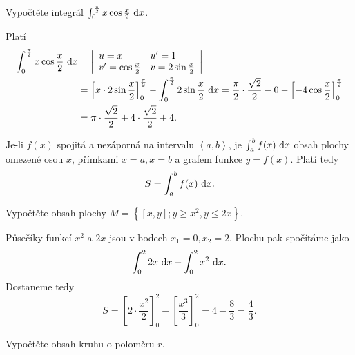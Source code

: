 \begin{priklad}
Vypočtěte integrál $\int _0^{\frac{\pi}{2}}x \cos \frac{x}{2}\, \mathop{}\!\mathrm{d} x$.
\end{priklad}

\begin{reseni}
Platí
\begin{align*}
\int _0^{\frac{\pi}{2}}x \cos \frac{x}{2}\, \mathop{}\!\mathrm{d} x &= \left | \begin{array}{ll}
    u=x & u^\prime = 1 \\
    v^\prime = \cos \frac{x}{2} & v = 2\sin \frac{x}{2}
\end{array}   \right | \\
& =\left [ x\cdot2\sin \frac{x}{2} \right ]_0^{\frac{\pi}{2}}-\int_0^{\frac{\pi}{2}}2\sin \frac{x}{2}\, \mathop{}\!\mathrm{d} x =\frac{\pi}{2}\cdot \frac{\sqrt{2} }{2}-0-\left [ -4\cos \frac{x}{2} \right ]_0^{\frac{\pi}{2}}\\
&= \pi \cdot \frac{\sqrt{2} }{2}+4\cdot \frac{\sqrt{2} }{2}+4.
\end{align*}
\end{reseni}

\begin{pozn}
    Je-li $f(x)$ spojitá a nezáporná na intervalu $\left<  a,b \right>$, je
    $\int_a ^b f(x)\, \mathop{}\!\mathrm{d} x$ obsah plochy omezené osou $x$, přímkami $x=a, x=b$ a
    grafem funkce $y=f(x)$. Platí tedy
    $$S=\int_a^b f(x)\, \mathop{}\!\mathrm{d} x.$$
\end{pozn}

\begin{priklad}
Vypočtěte obsah plochy $M=\left \{ [x,y]; y \geq  x^2 , y \leq 2x\right \} $.
\end{priklad}

\begin{reseni}
Půsečíky funkcí $x^2$ a $2x$ jsou v bodech $x_1=0,x_2=2$. Plochu pak spočítáme
jako
$$\int_0^2 2x\, \mathop{}\!\mathrm{d} x - \int_0^2 x^2 \, \mathop{}\!\mathrm{d} x.$$
Dostaneme tedy
$$
    S = \left [ 2 \cdot \frac{x^2}{2} \right ]_0^2 - \left [ \frac{x^3}{3} \right ]_0^2 = 4 - \frac{8}{3} = \frac{4}{3}.
$$
\end{reseni}

\begin{priklad}
Vypočtěte obsah kruhu o poloměru $r$.
\end{priklad}

